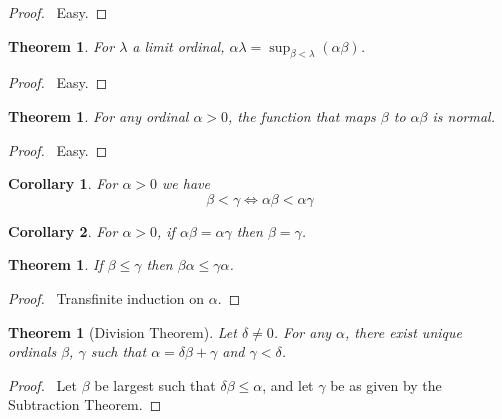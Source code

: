 \documentclass{report}
\let\qed\relax
\newtheorem{theorem}[axiom]{Theorem}
\newtheorem{corollary}{Corollary}[axiom]
\theoremstyle{definition}
\begin{document}
    \begin{proof}
        \pf\ Easy. \qed
    \end{proof}

    \begin{theorem}
        For $\lambda$ a limit ordinal, $\alpha \lambda = \sup_{\beta < \lambda} (\alpha \beta)$.
    \end{theorem}

    \begin{proof}
        \pf\ Easy. \qed
    \end{proof}

    \begin{theorem}
        For any ordinal $\alpha > 0$, the function that maps $\beta$ to $\alpha \beta$ is normal.
    \end{theorem}

    \begin{proof}
        \pf\ Easy. \qed
    \end{proof}

    \begin{corollary}
        For $\alpha > 0$ we have
        \[ \beta < \gamma \Leftrightarrow \alpha \beta < \alpha \gamma \]
    \end{corollary}
    
    \begin{corollary}
        For $\alpha > 0$, if $\alpha \beta = \alpha \gamma$ then $\beta = \gamma$.
    \end{corollary}

    \begin{theorem}
        If $\beta \leq \gamma$ then $\beta \alpha \leq \gamma \alpha$.
    \end{theorem}

    \begin{proof}
        \pf\ Transfinite induction on $\alpha$. \qed
    \end{proof}

    \begin{theorem}[Division Theorem]
        Let $\delta \neq 0$. For any $\alpha$, there exist unique ordinals $\beta$, $\gamma$ such that
        $\alpha = \delta \beta + \gamma$ and $\gamma < \delta$.
    \end{theorem}

    \begin{proof}
        \pf\ Let $\beta$ be largest such that $\delta \beta \leq \alpha$, and let $\gamma$ be as given by
        the Subtraction Theorem. \qed
    \end{proof}
\end{document}
